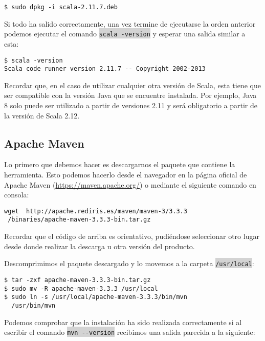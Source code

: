 \begin{lstlisting}
$ sudo dpkg -i scala-2.11.7.deb
\end{lstlisting}

Si todo ha salido correctamente, una vez termine de ejecutarse la orden anterior podemos ejecutar el comando \colorbox{lightgray}{\lstinline|scala -version|} y esperar una salida similar a esta:

\begin{lstlisting}
$ scala -version
Scala code runner version 2.11.7 -- Copyright 2002-2013
\end{lstlisting}

Recordar que, en el caso de utilizar cualquier otra versión de Scala, esta tiene que ser compatible con la versión Java que se encuentre instalada. Por ejemplo, Java 8 solo puede ser utilizado a partir de versiones 2.11 y será obligatorio a partir de la versión de Scala 2.12. \cite{Scala2.12Roadmap}


\subsection{Apache Maven}

Lo primero que debemos hacer es descargarnos el paquete que contiene la herramienta. Esto podemos hacerlo desde el navegador en la página oficial de Apache Maven (\url{https://maven.apache.org/}) o mediante el siguiente comando en consola:

\begin{lstlisting}
wget  http://apache.rediris.es/maven/maven-3/3.3.3
 /binaries/apache-maven-3.3.3-bin.tar.gz
\end{lstlisting}

Recordar que el código de arriba es orientativo, pudiéndose seleccionar otro lugar desde donde realizar la descarga u otra versión del producto.

Descomprimimos el paquete descargado y lo movemos  a la carpeta \colorbox{lightgray}{\lstinline|/usr/local|}:

\begin{lstlisting}
$ tar -zxf apache-maven-3.3.3-bin.tar.gz
$ sudo mv -R apache-maven-3.3.3 /usr/local
$ sudo ln -s /usr/local/apache-maven-3.3.3/bin/mvn 
  /usr/bin/mvn
\end{lstlisting}


Podemos comprobar que la instalación ha sido realizada correctamente si al escribir el comando \colorbox{lightgray}{\lstinline|mvn --version|} recibimos una salida parecida a la siguiente:

